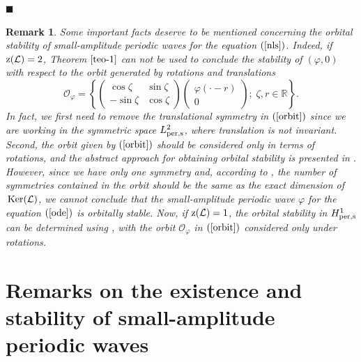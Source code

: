 \documentclass[12pt,reqno,a4paper]{amsart} %
\newcommand{\R}{{\mathbb R}}
\newcommand{\Ker}{{\rm \,Ker}}
\numberwithin{equation}{section}
\numberwithin{figure}{section}
\newtheorem{remark}[theorem]{Remark}
\begin{document}
\begin{flushright}
	$\blacksquare$
\end{flushright}


\begin{remark}\label{remstab} Some important facts deserve to be mentioned concerning the orbital stability of small-amplitude periodic waves for the equation $(\ref{nls})$. Indeed, if ${\rm z}(\mathcal{L})=2$, Theorem $\ref{teo-1}$ can not be used to conclude the stability of $(\varphi,0)$ with respect to the orbit generated by rotations and translations
	\begin{equation}\label{orbit}
		\mathcal{O}_\varphi =  \left\{ \left(
		\begin{array}{cc}
			\cos{\zeta} & \sin{\zeta} \\
			-\sin{\zeta} & \cos{\zeta}
		\end{array}
		\right) \left(
		\begin{array}{c}
			\varphi(\cdot-r) \\
			0
		\end{array}
		\right); \; \zeta,r \in \R \right\}.
	\end{equation}
In fact, we first need to remove the translational symmetry in $(\ref{orbit})$ since we are working in the symmetric space $L_{\rm per,s}^2$, where translation is not invariant. Second, the orbit given by $(\ref{orbit})$ should be considered only in terms of rotations, and the abstract approach for obtaining orbital stability is presented in \cite{GrillakisShatahStraussI}. However, since we have only one symmetry and, according to \cite{GrillakisShatahStraussI}, the number of symmetries contained in the orbit should be the same as the exact dimension of $\Ker(\mathcal{L})$, we cannot conclude that the small-amplitude periodic wave $\varphi$ for the equation $(\ref{ode})$ is orbitally stable. Now, if ${\rm z}(\mathcal{L}) = 1$, the orbital stability in $H_{\rm per,s}^1$ can be determined using \cite{GrillakisShatahStraussI}, with the orbit $\mathcal{O}_{\varphi}$ in $(\ref{orbit})$ considered only under rotations.

\end{remark}

\section{Remarks on the existence and stability of small-amplitude periodic waves}
\end{document}
